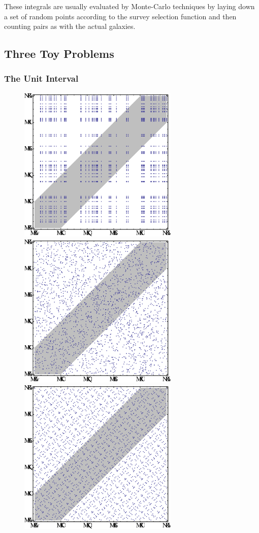 \documentclass[usenatbib]{mn2e}
\begin{document}
These integrals are usually evaluated by Monte-Carlo techniques by laying down a
set of random points according to the survey selection function and then
counting pairs as with the actual galaxies. 

\subsection{Three Toy Problems}

\subsubsection{The Unit Interval}

\begin{figure}
\includegraphics[width=3in]{plots/grid1d-1}
\includegraphics[width=3in]{plots/grid1d-2}
\includegraphics[width=3in]{plots/grid1d-3}

\end{figure}
\end{document}
